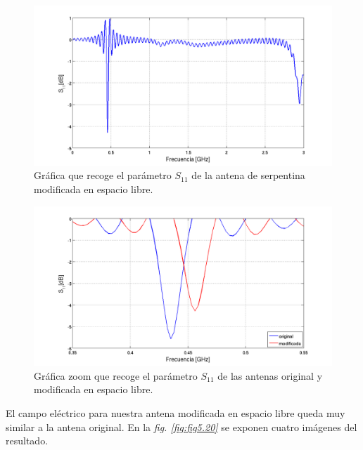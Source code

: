 \begin{figure}[!htb]
    \centering
    \includegraphics[scale=0.45]{./Simulaciones/matlab2/S11_tunned_free}
    \caption{Gráfica que recoge el parámetro $S_{11}$ de la antena de serpentina modificada en espacio libre.}
    \label{fig:fig5.18}
\end{figure}

\begin{figure}[!htb]
    \centering
    \includegraphics[scale=0.45]{./Simulaciones/matlab2/S11_vs_original_tunned_free_zoom}
    \caption{Gráfica zoom que recoge el parámetro $S_{11}$ de las antenas original y modificada en espacio libre.}
    \label{fig:fig5.19}
\end{figure}

\clearpage

El campo eléctrico para nuestra antena modificada en espacio libre queda muy similar a la antena original. En la \textit{fig. \ref{fig:fig5.20}} se exponen cuatro imágenes del resultado.

